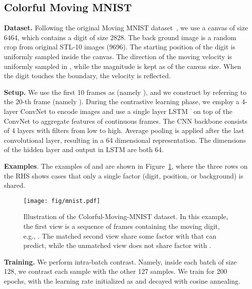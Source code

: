 \documentclass{article}
\begin{document}
\subsection{Colorful Moving MNIST}
\textbf{Dataset.} Following the original Moving MNIST dataset~\cite{srivastava2015unsupervised}, we use a canvas of size 6464, which contains a digit of size 2828. The back ground image is a random crop from original STL-10 images (9696). The starting position of the digit is uniformly sampled inside the canvas. The direction of the moving velocity is uniformly sampled in , while the magnitude is kept as  of the canvas size. When the digit touches the boundary, the velocity is reflected.

\noindent\textbf{Setup.} We use the first 10 frames as  (namely ), and we construct  by referring to the 20-th frame (namely ). During the contrastive learning phase, we employ a 4-layer ConvNet to encode images and use a single layer LSTM~\cite{hochreiter1997long} on top of the ConvNet to aggregate features of continuous frames. The CNN backbone consists of 4 layers with  filters from low to high. Average pooling is applied after the last convolutional layer, resulting in a 64 dimensional representation. The dimensions of the hidden layer and output in LSTM are both 64.

\noindent\textbf{Examples}. The examples of  and  are shown in Figure~\ref{fig:mnist}, where the three rows on the RHS shows cases that only a single factor (digit, position, or background) is shared.

\begin{figure}[t]
\centering
\texttt{[image: fig/mnist.pdf]}
\caption{\small Illustration of the Colorful-Moving-MNIST dataset. In this example, the first view  is a sequence of frames containing the moving digit, e.g., . The matched second view  share some factor with  that  can predict, while the unmatched view  does not share factor with .}
\vspace{-10pt}
\label{fig:mnist}
\end{figure}
 
\noindent\textbf{Training.} We perform intra-batch contrast. Namely, inside each batch of size 128, we contrast each sample with the other 127 samples. We train for 200 epochs, with the learning rate initialized as  and decayed with cosine annealing.
\end{document}
